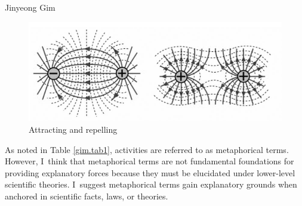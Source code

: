 \begin{artengenv}{Jinyeong Gim}
\begin{figure}[H]
 \begin{center}
 \includegraphics[width=.8\textwidth]{ART_Gim/fig.5300.jpg}%
 \end{center}%
 \caption{Attracting and repelling}\label{gim.fig5}
\end{figure}


As noted in Table \ref{gim.tab1}, activities are referred to as metaphorical terms. However, I~think that metaphorical terms are not fundamental foundations for providing explanatory forces because they must be elucidated under lower-level scientific theories. I~suggest metaphorical terms gain explanatory grounds when anchored in scientific facts, laws, or theories.


\end{artengenv}

